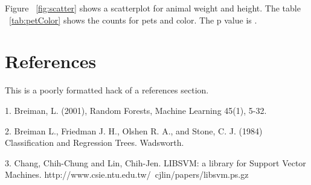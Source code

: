 \documentclass[letterpaper,twoside,10pt]{article}
\begin{document}
Figure ~\ref{fig:scatter} shows a scatterplot for animal weight and height. The table ~\ref{tab:petColor} shows the counts for pets and color. The p value is \unskip.



\section{References}\label{references}



This is a poorly formatted hack of a references section.

1. Breiman, L. (2001), Random Forests, Machine Learning 45(1), 5-32.

2. Breiman L., Friedman J. H., Olshen R. A., and Stone, C. J. (1984) Classification and Regression Trees. Wadsworth.

3. Chang, Chih-Chung and Lin, Chih-Jen. LIBSVM: a library for Support Vector Machines. http://www.csie.ntu.edu.tw/~cjlin/papers/libsvm.ps.gz
\end{document}
